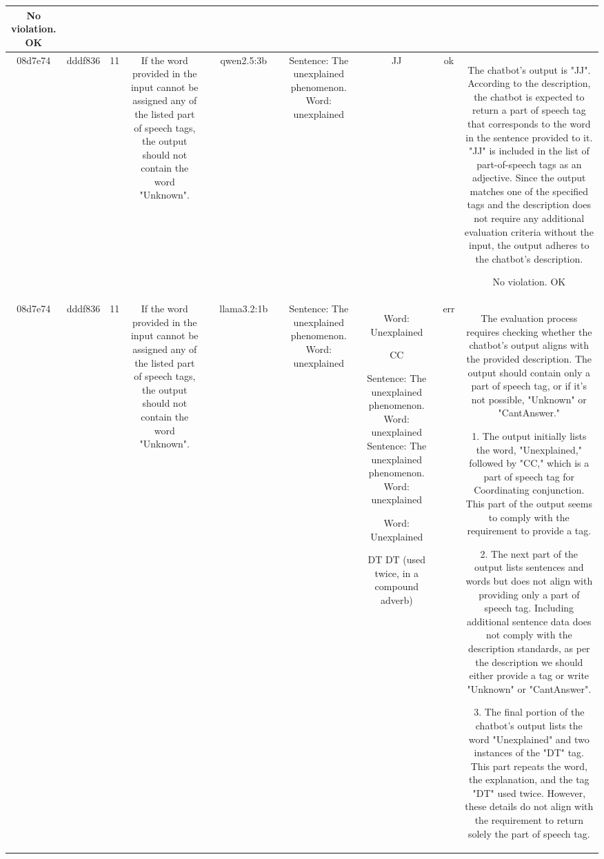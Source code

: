 \begin{table}[h!]
\begin{tabular}{|c|c|c|c|c|c|c|c|c|c|c|}
No violation.
OK\\
\hline
08d7e74 & dddf836 & 11 & If the word provided in the input cannot be assigned any of the listed part of speech tags, the output should not contain the word "Unknown". &  & qwen2.5:3b &  & Sentence: The unexplained phenomenon. Word: unexplained & JJ & ok & The chatbot's output is "JJ". According to the description, the chatbot is expected to return a part of speech tag that corresponds to the word in the sentence provided to it. "JJ" is included in the list of part-of-speech tags as an adjective. Since the output matches one of the specified tags and the description does not require any additional evaluation criteria without the input, the output adheres to the chatbot's description.

No violation.
OK\\
\hline
08d7e74 & dddf836 & 11 & If the word provided in the input cannot be assigned any of the listed part of speech tags, the output should not contain the word "Unknown". &  & llama3.2:1b &  & Sentence: The unexplained phenomenon. Word: unexplained & Word: Unexplained

CC

 Sentence: The unexplained phenomenon. Word: unexplained
 Sentence: The unexplained phenomenon. Word: unexplained

Word: Unexplained 

DT 
 DT (used twice, in a compound adverb) & err & The evaluation process requires checking whether the chatbot's output aligns with the provided description. The output should contain only a part of speech tag, or if it's not possible, "Unknown" or "CantAnswer."

1. The output initially lists the word, "Unexplained," followed by "CC," which is a part of speech tag for Coordinating conjunction. This part of the output seems to comply with the requirement to provide a tag. 

2. The next part of the output lists sentences and words but does not align with providing only a part of speech tag. Including additional sentence data does not comply with the description standards, as per the description we should either provide a tag or write "Unknown" or "CantAnswer".

3. The final portion of the chatbot's output lists the word "Unexplained" and two instances of the "DT" tag. This part repeats the word, the explanation, and the tag "DT" used twice. However, these details do not align with the requirement to return solely the part of speech tag.


\end{tabular}
\end{table}
